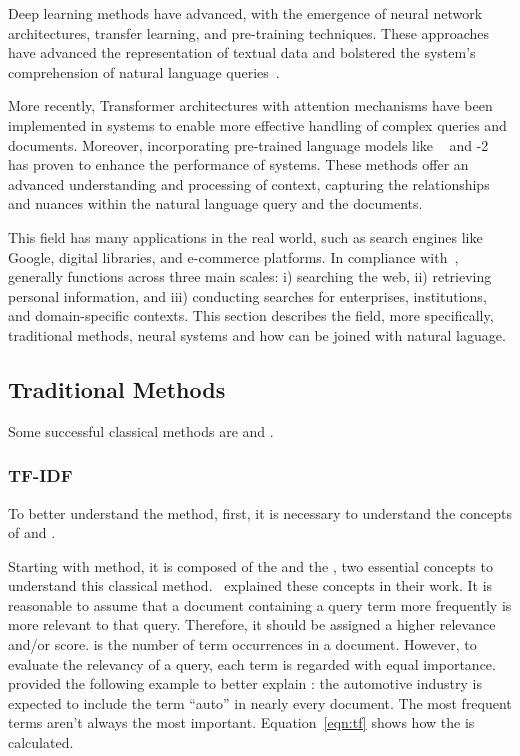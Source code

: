 Deep learning methods have advanced, with the emergence of neural network architectures, transfer learning, and pre-training techniques. These approaches have advanced the representation of textual data and bolstered the {\ir} system's comprehension of natural language queries~\cite{mitra_introduction_nodate}.

More recently, Transformer architectures with attention mechanisms have been implemented in {\ir} systems to enable more effective handling of complex queries and documents. Moreover, incorporating pre-trained language models like {\bert}~\cite{devlin_bert_2018} and {\gpt}-2 has proven to enhance the performance of {\ir} systems. These methods offer an advanced understanding and processing of context, capturing the relationships and nuances within the natural language query and the documents.

This field has many applications in the real world, such as search engines like Google, digital libraries, and e-commerce platforms. In compliance with~\citet{p_m_efficient_2021}, {\ir} generally functions across three main scales: i) searching the web, ii) retrieving personal information, and iii) conducting searches for enterprises, institutions, and domain-specific contexts. This section describes the {\ir} field, more specifically, traditional methods, neural {\ir} systems and how {\ir} can be joined with natural laguage.


\subsection{Traditional Methods}

Some successful classical methods are {\tfidf} and {\bm}.

\subsubsection{TF-IDF}

To better understand the {\tfidf} method, first, it is necessary to understand the concepts of {\tf} and {\idf}.

Starting with {\tfidf} method, it is composed of the {\tf} and the {\idf}, two essential concepts to understand this classical {\ir} method.~\citet{manning_introduction_2009} explained these concepts in their work. It is reasonable to assume that a document containing a query term more frequently is more relevant to that query. Therefore, it should be assigned a higher relevance and/or score. {\tf} is the number of term occurrences in a document. However, to evaluate the relevancy of a query, each term is regarded with equal importance.~\citet{manning_introduction_2009} provided the following example to better explain {\tf}: the automotive industry is expected to include the term ``auto'' in nearly every document. The most frequent terms aren't always the most important. Equation~\ref{eqn:tf} shows how the {\tf} is calculated.

